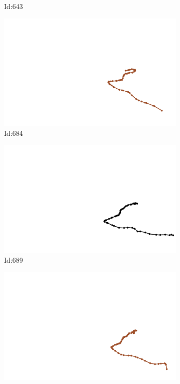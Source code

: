 \documentclass[12pt,twoside]{report}
\begin{document}
\begin{figure}
\begin{subfigure}[b]{0.20\textwidth}
\caption{Id:643}
\end{subfigure}
\begin{subfigure}[b]{0.20\textwidth}
\centering
\includegraphics[width=\textwidth]{../trajectories/684.png}
\caption{Id:684}
\end{subfigure}
\begin{subfigure}[b]{0.20\textwidth}
\centering
\includegraphics[width=\textwidth]{../trajectories/689.png}
\caption{Id:689}
\end{subfigure}
\begin{subfigure}[b]{0.20\textwidth}
\centering
\includegraphics[width=\textwidth]{../trajectories/698.png}

\end{subfigure}
\end{figure}
\end{document}
